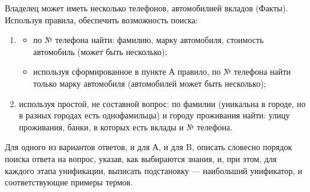 \documentclass[12pt]{report}
\begin{document}
Владелец может иметь несколько телефонов, автомобилией вкладов (Факты). Используя правила, обеспечить возможность поиска:

\begin{enumerate}
	\item \begin{itemize}
		\item по № телефона найти: фамилию, марку автомобиля, стоимость автомобиль (может быть несколько);
		\item используя сформированное в пункте А правило, по № телефона найти только марку автомобиля (автомобилей может быть несколько);
	\end{itemize}
	\item используя простой, не составной вопрос: по фамилии (уникальна в городе, но в разных городах есть однофамильцы) и городу проживания найти: улицу проживания, банки, в которых есть вклады и № телефона.
\end{enumerate}

Для одного из вариантов ответов, и для А, и для B, описать словесно порядок поиска ответа на вопрос, указав, как выбираются знания, и, при этом, для каждого этапа унификации, выписать подстановку — наибольший унификатор, и соответствующие примеры термов.
\end{document}
